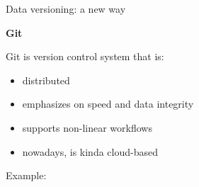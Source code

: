 \documentclass{beamer}
\begin{document}
\begin{frame}{Data versioning: a new way}

  \Large{\textbf {Git}}
  
  Git is version control system that is:
  
  \begin{itemize}
  
    \item distributed
    \item emphasizes on speed and data integrity
    \item supports non-linear workflows
    \item nowadays, is kinda cloud-based
  
  \end{itemize}
  
  Example:

\end{frame}
\end{document}
